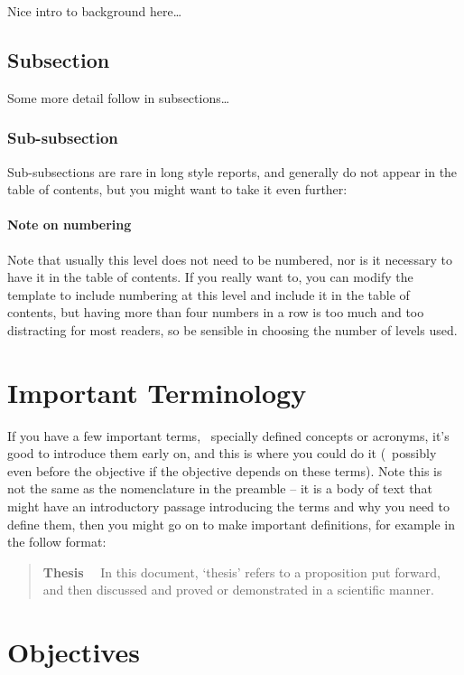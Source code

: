 Nice intro to background here\ldots{}

\subsection{Subsection}

Some more detail follow in subsections\ldots{}

\subsubsection{Sub-subsection}

Sub-subsections are rare in long style reports, and generally do not appear in the table of contents, but you might want to take it even further:

\paragraph{Note on numbering}

Note that usually this level does not need to be numbered, nor is it necessary to have it in the table of contents.  If you really want to, you can modify the template to include numbering at this level and include it in the table of contents, but having more than four numbers in a row is too much and too distracting for most readers, so be sensible in choosing the number of levels used.

\section{Important Terminology}

If you have a few important terms, \eg~specially defined concepts or acronyms, it's good to introduce them early on, and this is where you could do it (\ie~possibly even before the objective if the objective depends on these terms). Note this is not the same as the nomenclature in the preamble -- it is a body of text that might have an introductory passage introducing the terms and why you need to define them, then you might go on to make important definitions, for example in the follow format:

\begin{quote}
  \textbf{Thesis}~~
  In this document, `thesis' refers to a proposition put forward, and then discussed and proved or demonstrated in a scientific manner.
\end{quote}

\section{Objectives}

